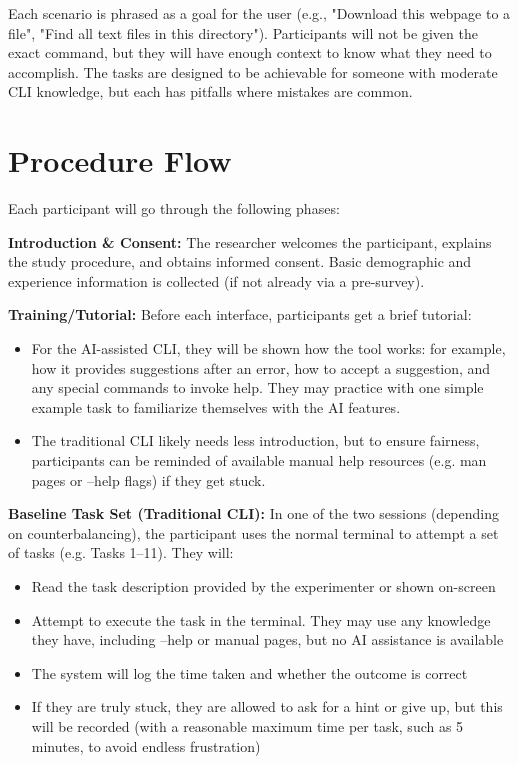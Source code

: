 Each scenario is phrased as a goal for the user (e.g., "Download this webpage to a file", "Find all text files in this directory"). Participants will not be given the exact command, but they will have enough context to know what they need to accomplish. The tasks are designed to be achievable for someone with moderate CLI knowledge, but each has pitfalls where mistakes are common.

\section{Procedure Flow}

Each participant will go through the following phases:

\textbf{Introduction \& Consent:} The researcher welcomes the participant, explains the study procedure, and obtains informed consent. Basic demographic and experience information is collected (if not already via a pre-survey).

\textbf{Training/Tutorial:} Before each interface, participants get a brief tutorial:
\begin{itemize}
	\item For the AI-assisted CLI, they will be shown how the tool works: for example, how it provides suggestions after an error, how to accept a suggestion, and any special commands to invoke help. They may practice with one simple example task to familiarize themselves with the AI features.
	\item The traditional CLI likely needs less introduction, but to ensure fairness, participants can be reminded of available manual help resources (e.g. man pages or --help flags) if they get stuck.
\end{itemize}

\textbf{Baseline Task Set (Traditional CLI):} In one of the two sessions (depending on counterbalancing), the participant uses the normal terminal to attempt a set of tasks (e.g. Tasks 1–11). They will:
\begin{itemize}
	\item Read the task description provided by the experimenter or shown on-screen
	\item Attempt to execute the task in the terminal. They may use any knowledge they have, including --help or manual pages, but no AI assistance is available
	\item The system will log the time taken and whether the outcome is correct
	\item If they are truly stuck, they are allowed to ask for a hint or give up, but this will be recorded (with a reasonable maximum time per task, such as 5 minutes, to avoid endless frustration)
\end{itemize}

